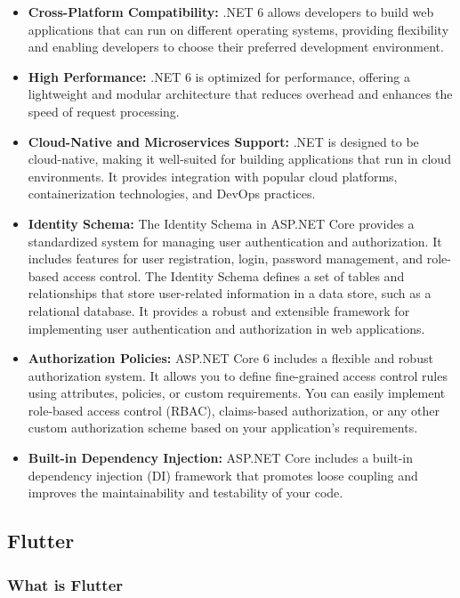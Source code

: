 \documentclass[
12pt,
oneside, 
onehalfspacing, 
nolistspacing, 
parskip, 
chapterinoneline, 
]{AASTCOMPUTER}
\begin{document}
\begin{itemize}
\item \textbf{Cross-Platform Compatibility:} .NET 6 allows developers to build web applications that can run on different operating systems, providing flexibility and enabling developers to choose their preferred development environment.

\item \textbf{High Performance:} .NET 6 is optimized for performance, offering a lightweight and modular architecture that reduces overhead and enhances the speed of request processing.

\item \textbf{Cloud-Native and Microservices Support:} .NET is designed to be cloud-native, making it well-suited for building applications that run in cloud environments. It provides integration with popular cloud platforms, containerization technologies, and DevOps practices.

\item \textbf{Identity Schema:} The Identity Schema in ASP.NET Core provides a standardized system for managing user authentication and authorization. It includes features for user registration, login, password management, and role-based access control. The Identity Schema defines a set of tables and relationships that store user-related information in a data store, such as a relational database. It provides a robust and extensible framework for implementing user authentication and authorization in web applications.

\item \textbf{Authorization Policies:} ASP.NET Core 6 includes a flexible and robust authorization system. It allows you to define fine-grained access control rules using attributes, policies, or custom requirements. You can easily implement role-based access control (RBAC), claims-based authorization, or any other custom authorization scheme based on your application's requirements.

\item \textbf{Built-in Dependency Injection:} ASP.NET Core includes a built-in dependency injection (DI) framework that promotes loose coupling and improves the maintainability and testability of your code.
\end{itemize}


\subsection{Flutter}
\subsubsection{What is Flutter}
\end{document}
